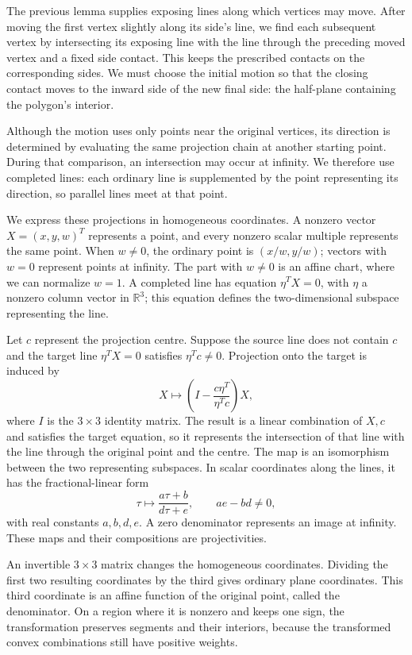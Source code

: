 \documentclass[11pt,a4paper]{article}
\theoremstyle{definition}
\theoremstyle{remark}
\numberwithin{equation}{section}
\begin{document}
The previous lemma supplies exposing lines along which vertices may move. After moving the first vertex slightly along its side's line, we find each subsequent vertex by intersecting its exposing line with the line through the preceding moved vertex and a fixed side contact. This keeps the prescribed contacts on the corresponding sides. We must choose the initial motion so that the closing contact moves to the inward side of the new final side: the half-plane containing the polygon's interior.

Although the motion uses only points near the original vertices, its direction is determined by evaluating the same projection chain at another starting point. During that comparison, an intersection may occur at infinity. We therefore use completed lines: each ordinary line is supplemented by the point representing its direction, so parallel lines meet at that point.

We express these projections in homogeneous coordinates. A nonzero vector $X=(x,y,w)^T$ represents a point, and every nonzero scalar multiple represents the same point. When $w\ne0$, the ordinary point is $(x/w,y/w)$; vectors with $w=0$ represent points at infinity. The part with $w\ne0$ is an affine chart, where we can normalize $w=1$. A completed line has equation $\eta^TX=0$, with $\eta$ a nonzero column vector in $\mathbb R^3$; this equation defines the two-dimensional subspace representing the line.

Let $c$ represent the projection centre. Suppose the source line does not contain $c$ and the target line $\eta^TX=0$ satisfies $\eta^Tc\ne0$. Projection onto the target is induced by
\[
 X\longmapsto\left(I-\frac{c\eta^T}{\eta^Tc}\right)X,
\]
where $I$ is the $3\times3$ identity matrix. The result is a linear combination of $X,c$ and satisfies the target equation, so it represents the intersection of that line with the line through the original point and the centre. The map is an isomorphism between the two representing subspaces. In scalar coordinates along the lines, it has the fractional-linear form
\[
 \tau\longmapsto\frac{a\tau+b}{d\tau+e},\qquad ae-bd\ne0,
\]
with real constants $a,b,d,e$. A zero denominator represents an image at infinity. These maps and their compositions are projectivities.

An invertible $3\times3$ matrix changes the homogeneous coordinates. Dividing the first two resulting coordinates by the third gives ordinary plane coordinates. This third coordinate is an affine function of the original point, called the denominator. On a region where it is nonzero and keeps one sign, the transformation preserves segments and their interiors, because the transformed convex combinations still have positive weights.
\end{document}
